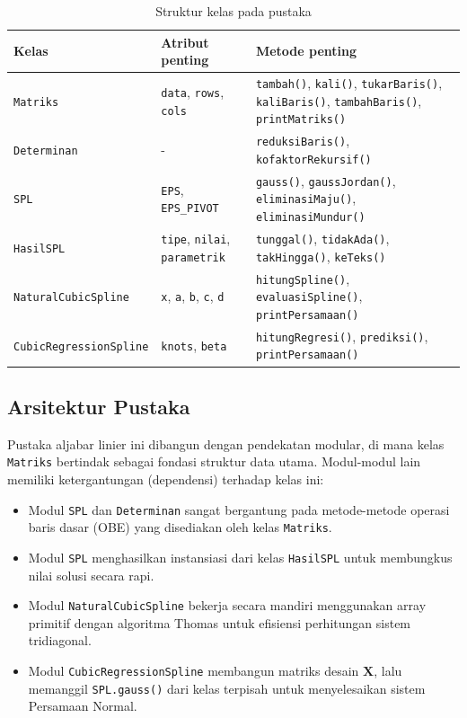 \documentclass[12pt]{article}
\begin{document}
\begin{enumerate}
\begin{table}[H]
    \centering
    \renewcommand{\arraystretch}{1.3}
    \begin{tabular}{|l|p{4cm}|p{6.5cm}|}
        \hline
        \textbf{Kelas} & \textbf{Atribut penting} & \textbf{Metode penting} \\
        \hline
        \texttt{Matriks} & \texttt{data}, \texttt{rows}, \texttt{cols} & \texttt{tambah()}, \texttt{kali()}, \texttt{tukarBaris()}, \texttt{kaliBaris()}, \texttt{tambahBaris()}, \texttt{printMatriks()} \\
        \hline
        \texttt{Determinan} & - & \texttt{reduksiBaris()}, \texttt{kofaktorRekursif()} \\
        \hline
        \texttt{SPL} & \texttt{EPS}, \texttt{EPS\_PIVOT} & \texttt{gauss()}, \texttt{gaussJordan()}, \texttt{eliminasiMaju()}, \texttt{eliminasiMundur()} \\
        \hline
        \texttt{HasilSPL} & \texttt{tipe}, \texttt{nilai}, \texttt{parametrik} & \texttt{tunggal()}, \texttt{tidakAda()}, \texttt{takHingga()}, \texttt{keTeks()} \\
        \hline
        \texttt{NaturalCubicSpline} & \texttt{x}, \texttt{a}, \texttt{b}, \texttt{c}, \texttt{d} & \texttt{hitungSpline()}, \texttt{evaluasiSpline()}, \texttt{printPersamaan()} \\
        \hline
        \texttt{CubicRegressionSpline} & \texttt{knots}, \texttt{beta} & \texttt{hitungRegresi()}, \texttt{prediksi()}, \texttt{printPersamaan()} \\
        \hline
    \end{tabular}
    \caption{Struktur kelas pada pustaka}
    \label{tab:kelas}
\end{table}

\subsection{Arsitektur Pustaka}
Pustaka aljabar linier ini dibangun dengan pendekatan modular, di mana kelas \texttt{Matriks} bertindak sebagai fondasi struktur data utama. Modul-modul lain memiliki ketergantungan (dependensi) terhadap kelas ini:
\begin{itemize}
    \item Modul \texttt{SPL} dan \texttt{Determinan} sangat bergantung pada metode-metode operasi baris dasar (OBE) yang disediakan oleh kelas \texttt{Matriks}.
    \item Modul \texttt{SPL} menghasilkan instansiasi dari kelas \texttt{HasilSPL} untuk membungkus nilai solusi secara rapi.
    \item Modul \texttt{NaturalCubicSpline} bekerja secara mandiri menggunakan array primitif dengan algoritma Thomas untuk efisiensi perhitungan sistem tridiagonal.
    \item Modul \texttt{CubicRegressionSpline} membangun matriks desain $\mathbf{X}$, lalu memanggil \texttt{SPL.gauss()} dari kelas terpisah untuk menyelesaikan sistem Persamaan Normal.
\end{itemize}


\end{enumerate}
\end{document}
